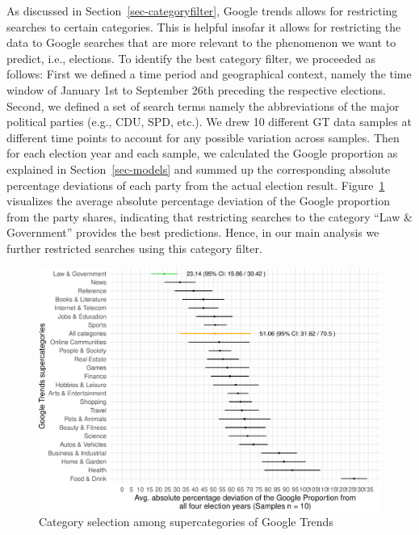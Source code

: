 \documentclass[
  letterpaper,
  DIV=11,
  numbers=noendperiod]{scrartcl}
\begin{document}
As discussed in Section~\ref{sec-categoryfilter}, Google trends allows
for restricting searches to certain categories. This is helpful insofar
it allows for restricting the data to Google searches that are more
relevant to the phenomenon we want to predict, i.e., elections. To
identify the best category filter, we proceeded as follows: First we
defined a time period and geographical context, namely the time window
of January 1st to September 26th preceding the respective elections.
Second, we defined a set of search terms namely the abbreviations of the
major political parties (e.g., CDU, SPD, etc.). We drew 10 different GT
data samples at different time points to account for any possible
variation across samples. Then for each election year and each sample,
we calculated the Google proportion as explained in
Section~\ref{sec-models} and summed up the corresponding absolute
percentage deviations of each party from the actual election result.
Figure~\ref{fig-A1} visualizes the average absolute percentage deviation
of the Google proportion from the party shares, indicating that
restricting searches to the category ``Law \& Government'' provides the
best predictions. Hence, in our main analysis we further restricted
searches using this category filter.

\begin{figure}[H]

\caption{\label{fig-A1}Category selection among supercategories of
Google Trends}

{\centering \includegraphics{figures/fig-A1-1.pdf}

}

\end{figure}
\end{document}
